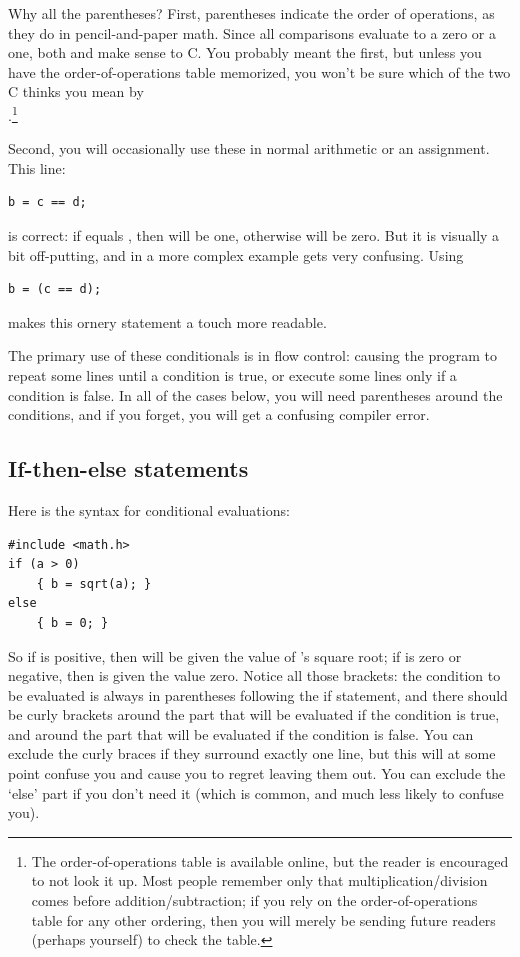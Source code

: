 \documentclass[12pt]{article}
\makeatletter
\def\ttindex#1{\index{#1@\cinline{#1}}}
\makeatother
\begin{document}
Why all the parentheses? First, parentheses indicate the order of
operations, as they do in pencil-and-paper math. Since all comparisons
evaluate to a zero or a one, both 
and  make sense to C. You probably meant
the first, but unless you have the order-of-operations table memorized,
you won't be sure which of the two C thinks you mean by\\ .\footnote{The order-of-operations table is available
online, but the reader is encouraged to not look it up. Most
people remember only that multiplication/division comes before
addition/subtraction; if you rely on the order-of-operations table
for any other ordering, then you will merely be sending future readers
(perhaps yourself) to check the table.}

Second, you will occasionally use these in normal arithmetic or an assignment. This line:
\begin{lstlisting}
b = c == d;
\end{lstlisting}
is correct: if  equals , then  will be one, otherwise  will be zero. But
it is visually a bit off-putting, and in a more complex example gets very confusing. Using
\begin{lstlisting}
b = (c == d);
\end{lstlisting}
makes this ornery statement a touch more readable.

The primary use of these conditionals is in flow control: causing
the program to repeat some lines until a condition is true, or execute some lines only if a condition is
false.  In all of the cases below, you will need parentheses around the conditions, and if you forget,
you will get a confusing compiler error.

\subsection{If-then-else statements} Here is the syntax for conditional evaluations: \ttindex{if}

\begin{lstlisting}
#include <math.h>
if (a > 0)
    { b = sqrt(a); }
else 
    { b = 0; }
\end{lstlisting}
So if  is positive, then  will be given the value of 's square root; if  is
zero or negative, then  is given the value zero. Notice all those brackets: the condition to be
evaluated is always in parentheses following the if statement, and there should be curly brackets around
the part that will be evaluated if the condition is true, and around the part that will be evaluated if
the condition is false. You can exclude the curly braces if they surround exactly one line, but this
will at some point confuse you and cause you to regret leaving them out.
You can exclude the `else' part if you don't need it (which is common, and much less likely to confuse you).
\end{document}
